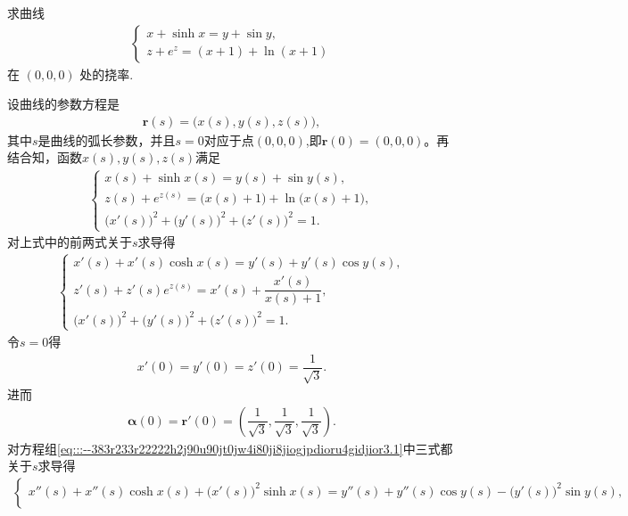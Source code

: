 \documentclass[../../main.tex]{subfiles}%
\begin{document}
\begin{example}
求曲线
\begin{align*}
\begin{cases}
x + \sinh x = y + \sin y, \\
z + e^z = (x + 1) + \ln(x + 1)
\end{cases}
\end{align*}
在 $(0,0,0)$ 处的挠率.
\end{example}
\begin{solution}
设曲线的参数方程是
\begin{align*}
\bm{r}(s) = \big(x(s), y(s), z(s)\big),
\end{align*}
其中$s$是曲线的弧长参数，并且$s=0$对应于点$(0,0,0)$,即$\bm{r}(0)=(0,0,0)$。再结合知，函数$x(s), y(s), z(s)$满足
\begin{align*}
\begin{cases}
x(s) + \sinh x(s) = y(s) + \sin y(s), \\
z(s) + e^{z(s)} = \big(x(s) + 1\big) + \ln\big(x(s) + 1\big), \\
\big(x'(s)\big)^2 + \big(y'(s)\big)^2 + \big(z'(s)\big)^2 = 1.
\end{cases}
\end{align*}
对上式中的前两式关于$s$求导得
\begin{align}
\begin{cases}
x'(s) + x'(s)\cosh x(s) = y'(s) + y'(s)\cos y(s), \\
z'(s) + z'(s)e^{z(s)} = x'(s) + \dfrac{x'(s)}{x(s) + 1}, \\
\big(x'(s)\big)^2 + \big(y'(s)\big)^2 + \big(z'(s)\big)^2 = 1.
\end{cases}
\label{eq:::--383r233r22222h2j90u90jt0jw4i80ji8jiogjpdioru4gidjior3.1}
\end{align}
令$s=0$得
\begin{align*}
x'(0) = y'(0) = z'(0) = \dfrac{1}{\sqrt{3}}.
\end{align*}
进而
\begin{align*}
\bm{\alpha}(0) = \bm{r}'(0) = \left( \dfrac{1}{\sqrt{3}}, \dfrac{1}{\sqrt{3}}, \dfrac{1}{\sqrt{3}} \right).
\end{align*}
对方程组\eqref{eq:::--383r233r22222h2j90u90jt0jw4i80ji8jiogjpdioru4gidjior3.1}中三式都关于$s$求导得
\begin{align}\label{eq::290ru03u903it0jrjrjgrj}
\begin{cases}
x''(s) + x''(s)\cosh x(s) + \big(x'(s)\big)^2\sinh x(s) = y''(s) + y''(s)\cos y(s) - \big(y'(s)\big)^2\sin y(s), \\

\end{cases}
\end{align}
\end{solution}
\end{document}

